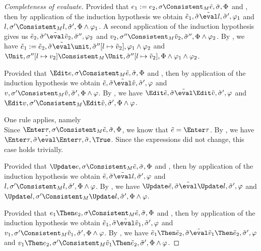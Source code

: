 \begin{proof}[Completeness of evaluate]
    {
    Provided that $e_1:= e_2,\sigma\Consistent_M \tilde{e},\tilde{\sigma},\Phi$ and ,
    then by application of the induction hypothesis we obtain $\tilde{e}_1,\tilde{\sigma}\tilde{\eval}l,\tilde{\sigma}',\phi_1$
    and $l,\sigma'\Consistent_M l,\tilde{\sigma}',\Phi\land\phi_1$.
    A second application of the induction hypothesis gives us  $\tilde{e}_2,\tilde{\sigma}'\tilde{\eval}\tilde{v}_2,\tilde{\sigma}'',\phi_2$
    and $v_2,\sigma''\Consistent_M \tilde{v}_2,\tilde{\sigma}'',\Phi\land\phi_2$.
    By , we have $\tilde{e}_1 := \tilde{e}_2,\tilde{\sigma}\tilde{\eval}\unit,\tilde{\sigma}''[l\mapsto\tilde{v}_2],\phi_1\land\phi_2$ and $\Unit,\sigma''[l\mapsto v_2]\Consistent_M \Unit,\tilde{\sigma}''[l\mapsto\tilde{v}_2],\Phi\land\phi_1\land\phi_2$.
    }

    {
    Provided that $\Edit e,\sigma\Consistent_M \tilde{e},\tilde{\sigma},\Phi$ and ,
    then by application of the induction hypothesis we obtain $\tilde{e},\tilde{\sigma}\tilde{\eval}\tilde{v},\tilde{\sigma}',\phi$
    and $v,\sigma'\Consistent_M \tilde{v},\tilde{\sigma}',\Phi\land\phi$.
    By , we have $\Edit\tilde{e},\tilde{\sigma}\tilde{\eval}\Edit\tilde{v},\tilde{\sigma}',\phi$ and $\Edit v,\sigma'\Consistent_M \Edit \tilde{v},\tilde{\sigma}',\Phi\land\phi$.

    }

    {
    One rule applies, namely \\
    Since $\Enter \tau,\sigma\Consistent_M \tilde{e},\tilde{\sigma},\Phi$, we know that $\tilde{e}=\Enter \tau$.
    By , we have $\Enter \tau,\tilde{\sigma}\tilde{\eval}\Enter \tau,\tilde{\sigma},\True$.
    Since the expressions did not change, this case holds trivially.
    }

    {Provided that $\Update e,\sigma\Consistent_M \tilde{e},\tilde{\sigma},\Phi$ and ,
    then by application of the induction hypothesis we obtain $\tilde{e},\tilde{\sigma}\tilde{\eval}l,\tilde{\sigma}',\phi$
    and $l,\sigma'\Consistent_M l,\tilde{\sigma}',\Phi\land\phi$.
    By , we have $\Update\tilde{e},\tilde{\sigma}\tilde{\eval}\Update l,\tilde{\sigma}',\phi$ and $\Update l,\sigma'\Consistent_M \Update l ,\tilde{\sigma}',\Phi\land\phi$.

    }

    {
    Provided that $e_1\Then e_2,\sigma\Consistent_M \tilde{e},\tilde{\sigma},\Phi$ and ,
    then by application of the induction hypothesis we obtain $\tilde{e}_1,\tilde{\sigma}\tilde{\eval}\tilde{v}_1,\tilde{\sigma}',\phi$
    and $v_1,\sigma'\Consistent_M \tilde{v}_1,\tilde{\sigma}',\Phi\land\phi$.
    By , we have $\tilde{e}_1\Then \tilde{e}_2,\tilde{\sigma}\tilde{\eval}\tilde{v}_1\Then\tilde{e}_2,\tilde{\sigma}',\phi$ and $v_1\Then e_2 ,\sigma'\Consistent_M \tilde{v}_1\Then\tilde{e}_2 ,\tilde{\sigma}',\Phi\land\phi$.

}
\end{proof}
